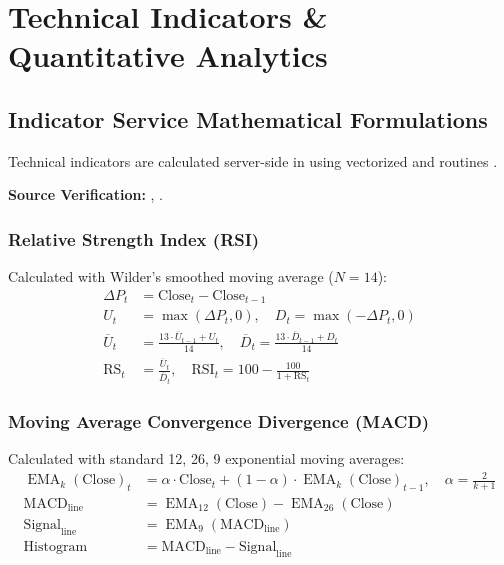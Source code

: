 \chapter{Technical Indicators \& Quantitative Analytics}
\label{ch:technical_indicators}

\section{Indicator Service Mathematical Formulations}
Technical indicators are calculated server-side in  using vectorized  and  routines \cite{ref:indicator_service}.

\begin{citationbox}
\textbf{Source Verification:} , .
\end{citationbox}

\subsection{Relative Strength Index (RSI)}
Calculated with Wilder's smoothed moving average ($N=14$):
\begin{align}
    \Delta P_t &= \mathrm{Close}_t - \mathrm{Close}_{t-1} \\
    U_t &= \max(\Delta P_t, 0), \quad D_t = \max(-\Delta P_t, 0) \\
    \overline{U}_t &= \frac{13 \cdot \overline{U}_{t-1} + U_t}{14}, \quad \overline{D}_t = \frac{13 \cdot \overline{D}_{t-1} + D_t}{14} \\
    \mathrm{RS}_t &= \frac{\overline{U}_t}{\overline{D}_t}, \quad \mathrm{RSI}_t = 100 - \frac{100}{1 + \mathrm{RS}_t}
\end{align}

\subsection{Moving Average Convergence Divergence (MACD)}
Calculated with standard 12, 26, 9 exponential moving averages:
\begin{align}
    \operatorname{EMA}_k(\mathrm{Close})_t &= \alpha \cdot \mathrm{Close}_t + (1 - \alpha) \cdot \operatorname{EMA}_k(\mathrm{Close})_{t-1}, \quad \alpha = \frac{2}{k+1} \\
    \mathrm{MACD}_{\mathrm{line}} &= \operatorname{EMA}_{12}(\mathrm{Close}) - \operatorname{EMA}_{26}(\mathrm{Close}) \\
    \mathrm{Signal}_{\mathrm{line}} &= \operatorname{EMA}_{9}(\mathrm{MACD}_{\mathrm{line}}) \\
    \mathrm{Histogram} &= \mathrm{MACD}_{\mathrm{line}} - \mathrm{Signal}_{\mathrm{line}}
\end{align}


